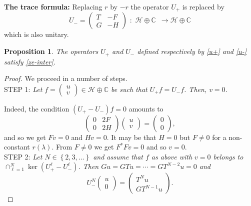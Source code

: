 \documentclass[12pt]{amsart}
\newtheorem{prop}[thm]{Proposition}
\theoremstyle{definition}
\theoremstyle{remark}
\numberwithin{equation}{section}
\begin{document}
{\bf The trace formula:}
Replacing $r$ by $-r$ the operator $U_+$ is replaced by
\begin{equation}
  \label{u-}
U_-=\begin{pmatrix} T&-F\\ G&-H\end{pmatrix}\,\, :\,\,\mathcal H\oplus \mathbb C\,\,\,\longrightarrow \mathcal H\oplus \mathbb C
\end{equation}
which is also unitary.\\


\begin{prop}
The operators $U_+$ and $U_-$ defined respectively by \eqref{u+} and \eqref{u-} satisfy \eqref{ze-inter}.
\end{prop}

\begin{proof}
  We proceed in a number of steps.\\

  STEP 1: {\sl Let $f=\begin{pmatrix}u\\v\end{pmatrix}\in\mathcal H\oplus \mathbb C$ be such that $U_+f=U_-f$. Then, $v=0$.}\smallskip

  Indeed, the condition $(U_+-U_-)f=0$ amounts to
\[
  \begin{pmatrix}0&2F\\0&2H\end{pmatrix}\begin{pmatrix}u\\v\end{pmatrix}=\begin{pmatrix}0\\ 0 \end{pmatrix},
\]
and so we get $Fv=0$ and $Hv=0$. It may be that $H=0$ but $F\not=0$ for a non-constant $r({\lambda})$. From $F\not=0$ we get $F^*Fv=0$ and so $v=0$.\\

STEP 2: {\sl Let $N\in\left\{2,3,\ldots\right\}$ and assume that $f$ as above with $v=0$ belongs to $\cap_{\ell=1}^N\ker(U_+^\ell-U_-^\ell)$.
  Then $Gu=GTu=\cdots =GT^{N-2}u=0$ and
  \begin{equation}
    U_-^N\begin{pmatrix}u\\0\end{pmatrix}=\begin{pmatrix}T^{N}u\\ GT^{N-1}u\end{pmatrix}.
    \end{equation}
  }


\end{proof}
\end{document}
